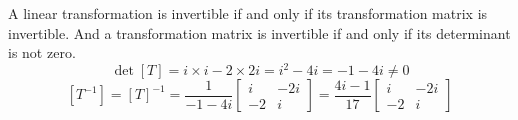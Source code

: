 \documentclass{article}
\newenvironment{answers}{ %
	\begin{enumerate}
		\setlength{\itemsep}{\bigskipamount}
}{\end{enumerate}}
\begin{document}
\begin{answers}
\begin{enumerate}
				A linear transformation is invertible if and only if its transformation matrix is invertible. And a transformation matrix is invertible if and only if its determinant is not zero.
				\begin{equation*}
					\det [T] = i \times i - 2 \times 2i = i^2 - 4i = -1 - 4i \neq 0
				\end{equation*}
				\begin{equation*}
					\left[ T^{-1} \right] = [T]^{-1}
					= \frac{1}{-1-4i}\left[ \begin{matrix} i & -2i \\ -2 & i \end{matrix} \right]
					= \frac{4i-1}{17}\left[ \begin{matrix} i & -2i \\ -2 & i \end{matrix} \right]
				\end{equation*}
		\end{enumerate}
\end{answers}
\end{document}
